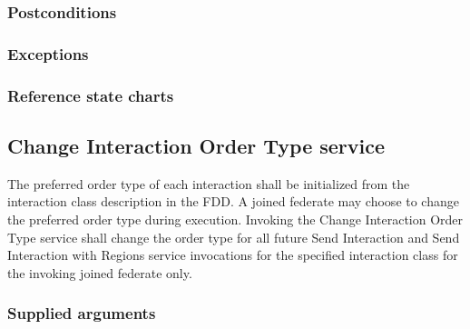 \begin{compactstdpage}


    \subsubsection{Postconditions}


    \subsubsection{Exceptions}


    \subsubsection{Reference state charts}


    \subsection{Change Interaction Order Type service}

    The preferred order type of each interaction shall be initialized from the interaction class description in the FDD. A joined federate may choose to change the preferred order type during execution. Invoking the Change Interaction Order Type service shall change the order type for all future Send Interaction and Send Interaction with Regions service invocations for the specified interaction class for the invoking joined federate only.

    \subsubsection{Supplied arguments}


\end{compactstdpage}
